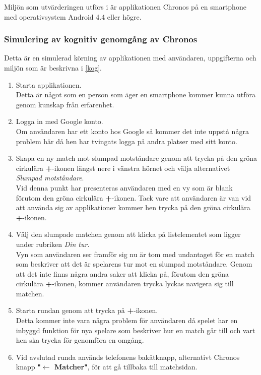 \documentclass[a4paper, 11pt]{article}
\begin{document}
Miljön som utvärderingen utförs i är applikationen Chronos på en smartphone med operativsystem Android 4.4 eller högre.

\subsubsection{Simulering av kognitiv genomgång av Chronos}
Detta är en simulerad körning av applikationen med användaren, uppgifterna och miljön som är beskrivna i \ref{kog}.\\
\begin{enumerate}
\item Starta applikationen. \\ 
Detta är något som en person som äger en smartphone kommer kunna utföra genom kunskap från erfarenhet.
\item Logga in med Google konto.\\ 
Om användaren har ett konto hos Google så kommer det inte uppstå några problem här då hen har tvingats logga på andra platser med sitt konto.
\item Skapa en ny match mot slumpad motståndare genom att trycka på den gröna cirkulära \textbf{+}-ikonen längst nere i vänstra hörnet och välja alternativet \textit{Slumpad motståndare}.\\
Vid denna punkt har presenteras användaren med en vy som är blank förutom den gröna cirkulära \textbf{+}-ikonen. Tack vare att användaren är van vid att använda sig av applikationer kommer hen trycka på den gröna cirkulära \textbf{+}-ikonen.
\item Välj den slumpade matchen genom att klicka på listelementet som ligger under rubriken \textit{Din tur}.\\
Vyn som användaren ser framför sig nu är tom med undantaget för en match som beskriver att det är spelarens tur mot en slumpad motståndare. Genom att det inte finns några andra saker att klicka på, förutom den gröna cirkulära \textbf{+}-ikonen, kommer användaren trycka lyckas navigera sig till matchen.
\item Starta rundan genom att trycka på \textbf{+}-ikonen.\\
Detta kommer inte vara några problem för användaren då spelet har en inbyggd funktion för nya spelare som beskriver hur en match går till och vart hen ska trycka för genomföra en omgång.
\item Vid avslutad runda används telefonens bakåtknapp, alternativt Chronos knapp \textbf{"$\leftarrow$ Matcher"}, för att gå tillbaka till matchsidan.\\

\end{enumerate}
\end{document}
